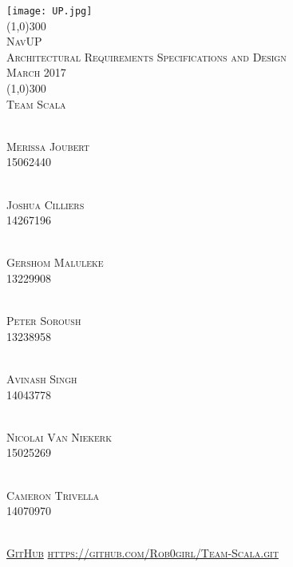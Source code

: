 \documentclass[runningheads,a4paper]{article}
\begin{document}
	
	\begin{titlepage}
		\begin{center}
			\texttt{[image: UP.jpg]}  \\
			[1cm]
			\line(1,0){300} \\
			[0.3cm]
			\textsc{\Large
				NavUP\\
				Architectural Requirements Specifications and Design \\
				\hfill {} March 2017
			}\\
			[0.1cm]
			\line(1,0){300} \\
			[0.7cm]
			\textsc{\Large
				Team Scala
			} \\
			
			
			
		\end{center}
		
		\begin{center}
			\begin{multicols}{2}
				\textsc{\large\\
					Merissa Joubert \\ 
					15062440\\ 
				}
				
				\textsc{\large\\
					Joshua Cilliers \\
					14267196\\ 
				}
				
				\textsc{\large\\
					Gershom Maluleke \\
					13229908\\ 
				}
				
				\textsc{\large\\
					Peter Soroush\\
					13238958\\ 
				}
				
				\columnbreak
				
				\textsc{\large\\
					Avinash Singh\\
					14043778\\
				}
				
				\textsc{\large\\
					Nicolai Van Niekerk\\
					15025269\\
				}
				
				\textsc{\large\\
					Cameron Trivella\\
					14070970\\ 
				}
				
			\end{multicols}
			
			
			\textsc{	\\ \href{https://github.com/Rob0girl/Team-Scala.git}{GitHub}
				\url{https://github.com/Rob0girl/Team-Scala.git}}
			
		\end{center}
	\end{titlepage}
	
	\begingroup
	
	\tableofcontents
	\endgroup
	\newpage
	
	
	
	
\end{document}
